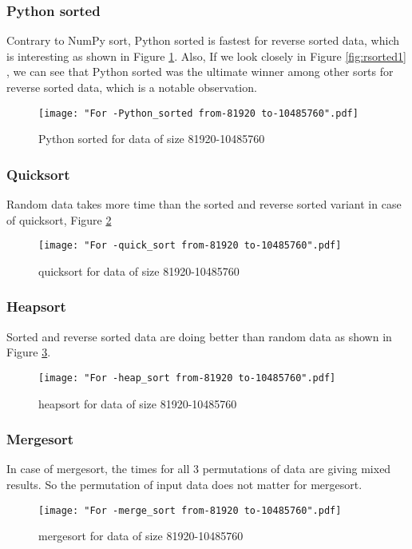 \documentclass[sigconf, nonacm, natbib, screen, balance=False]{acmart}
\begin{document}
\subsubsection{Python sorted}
Contrary to NumPy sort, Python sorted is fastest for reverse sorted data, which is interesting as shown in Figure \ref{fig:Pythonsorted}. Also, If we look closely in Figure \ref{fig:rsorted1} , we can see that Python sorted was the ultimate winner among other sorts for reverse sorted data, which is a notable observation.

\begin{figure}[ht]
\texttt{[image: "For -Python\_sorted from-81920 to-10485760".pdf]}
    \caption{Python sorted for data of size 81920-10485760 }
    \label{fig:Pythonsorted}
\end{figure}

\subsubsection{Quicksort}
Random data takes more time than the sorted and reverse sorted variant in case of quicksort, Figure \ref{fig:quicksort}

\begin{figure}[ht]
\texttt{[image: "For -quick\_sort from-81920 to-10485760".pdf]}
    \caption{quicksort for data of size 81920-10485760 }
    \label{fig:quicksort}
\end{figure}

\subsubsection{Heapsort}
Sorted and reverse sorted data are doing better than random data as shown in Figure \ref{fig:heapsort}.
\begin{figure}[ht]
\texttt{[image: "For -heap\_sort from-81920 to-10485760".pdf]}
    \caption{heapsort for data of size 81920-10485760 }
    \label{fig:heapsort}
\end{figure}

\subsubsection{Mergesort}
In case of mergesort, the times for all 3 permutations of data are giving mixed results. So the permutation of input data does not matter for mergesort.

\begin{figure}[ht]
\texttt{[image: "For -merge\_sort from-81920 to-10485760".pdf]}
    \caption{mergesort for data of size 81920-10485760 }
    \label{fig:mergesort}
\end{figure}
\end{document}

